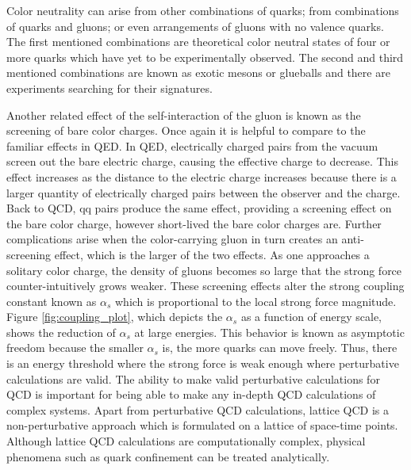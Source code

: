 Color neutrality can arise from other combinations of quarks; from combinations of quarks and gluons; or even arrangements of gluons with no valence quarks. The first mentioned combinations are theoretical color neutral states of four or more quarks which have yet to be experimentally observed. The second and third mentioned combinations are known as exotic mesons or glueballs and there are experiments searching for their signatures.

Another related effect of the self-interaction of the gluon is known as the screening of bare color charges.  Once again it is helpful to compare to the familiar effects in QED. In QED, electrically charged pairs from the vacuum screen out the bare electric charge, causing the effective charge to decrease. This effect increases as the distance to the electric charge increases because there is a larger quantity of electrically charged pairs between the observer and the charge. Back to QCD, qq pairs produce the same effect, providing a screening effect on the bare color charge, however short-lived the bare color charges are. Further complications arise when the color-carrying gluon in turn creates an anti-screening effect, which is the larger of the two effects. As one approaches a solitary color charge, the density of gluons becomes so large that the strong force counter-intuitively grows weaker. These screening effects alter the strong coupling constant known as $\alpha_s$ which is proportional to the local strong force magnitude. Figure \ref{fig:coupling_plot}, which depicts the $\alpha_s$ as a function of energy scale, shows the reduction of $\alpha_s$ at large energies. This behavior is known as asymptotic freedom because the smaller $\alpha_s$ is, the more quarks can move freely. Thus, there is an energy threshold where the strong force is weak enough where perturbative calculations are valid. The ability to make valid perturbative calculations for QCD is important for being able to make any in-depth QCD calculations of complex systems. Apart from perturbative QCD calculations, lattice QCD is a non-perturbative approach which is formulated on a lattice of space-time points. Although lattice QCD calculations are computationally complex, physical phenomena such as quark confinement can be treated analytically.

